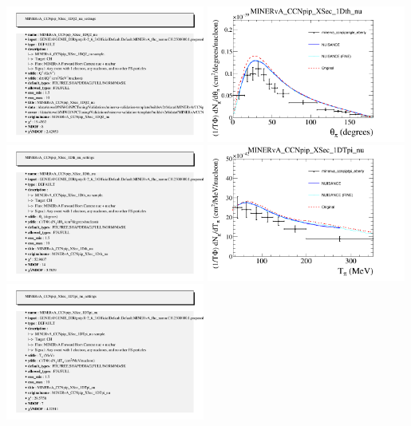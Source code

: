 \documentclass{article}
\begin{document}
\includegraphics[width=0.49\textwidth]{figures/minerva_cc1pipq2_2016_info.png}
\centering
\includegraphics[width=0.49\textwidth]{figures/minerva_ccnpipangle_eberly_comp.png}
\includegraphics[width=0.49\textwidth]{figures/minerva_ccnpipangle_eberly_info.png}
\centering
\includegraphics[width=0.49\textwidth]{figures/minerva_ccnpiptpi_eberly_comp.png}
\includegraphics[width=0.49\textwidth]{figures/minerva_ccnpiptpi_eberly_info.png}
\end{document}
